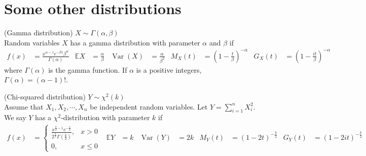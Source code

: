\documentclass{huhtakm-template-book}
\newcommand{\expect}{\mathbb{E}}
\DeclareMathOperator{\Var}{Var}
\begin{document}
\chapter{Some other distributions}
\begin{eg}(Gamma distribution) $X\sim\Gamma(\alpha,\beta)$\\
    Random variables $X$ has a gamma distribution with parameter $\alpha$ and $\beta$ if
    \begin{align*}
        f(x)&=\frac{x^{\alpha-1}e^{-\beta x}\beta^{\alpha}}{\Gamma(\alpha)} & \expect X&=\frac{\alpha}{\beta} & \Var(X)&=\frac{\alpha}{\beta^{2}} & M_{X}(t)&=\left(1-\frac{t}{\beta}\right)^{-\alpha} & G_{X}(t)&=\left(1-\frac{it}{\beta}\right)^{-\alpha}
    \end{align*}
    where $\Gamma(\alpha)$ is the gamma function. If $\alpha$ is a positive integers, $\Gamma(\alpha)=(\alpha-1)!$.
\end{eg}
\begin{eg}(Chi-squared distribution) $Y\sim\chi^{2}(k)$\\
    Assume that $X_{1},X_{2},\cdots,X_{n}$ be independent random variables. Let $Y=\sum_{i=1}^{n}X_{i}^{2}$. We say $Y$ has a $\chi^{2}$-distribution with parameter $k$ if
    \begin{align*}
        f(x)&=\begin{cases}
            \frac{x^{\frac{k}{2}-1}e^{-\frac{x}{2}}}{2^{\frac{k}{2}}\Gamma\left(\frac{k}{2}\right)}, &x>0\\
            0, &x\leq 0
        \end{cases} & \expect Y&=k & \Var(Y)&=2k & M_{Y}(t)&=(1-2t)^{-\frac{k}{2}} & G_{Y}(t)&=(1-2it)^{-\frac{k}{2}}
    \end{align*}
\end{eg}
\end{document}
